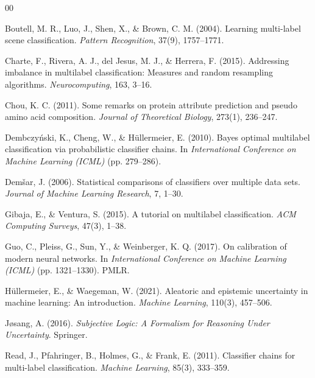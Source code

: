 \documentclass[1p,times]{elsarticle}
\begin{document}
\FloatBarrier
\begin{thebibliography}{00}

Boutell, M. R., Luo, J., Shen, X., \& Brown, C. M. (2004).
Learning multi-label scene classification.
\textit{Pattern Recognition}, 37(9), 1757--1771.

Charte, F., Rivera, A. J., del Jesus, M. J., \& Herrera, F. (2015).
Addressing imbalance in multilabel classification: Measures and random resampling algorithms.
\textit{Neurocomputing}, 163, 3--16.

Chou, K. C. (2011).
Some remarks on protein attribute prediction and pseudo amino acid composition.
\textit{Journal of Theoretical Biology}, 273(1), 236--247.

Dembczy{\'n}ski, K., Cheng, W., \& H{\"u}llermeier, E. (2010).
Bayes optimal multilabel classification via probabilistic classifier chains.
In \textit{International Conference on Machine Learning (ICML)} (pp. 279--286).

Dem{\v{s}}ar, J. (2006).
Statistical comparisons of classifiers over multiple data sets.
\textit{Journal of Machine Learning Research}, 7, 1--30.

Gibaja, E., \& Ventura, S. (2015).
A tutorial on multilabel classification.
\textit{ACM Computing Surveys}, 47(3), 1--38.

Guo, C., Pleiss, G., Sun, Y., \& Weinberger, K. Q. (2017).
On calibration of modern neural networks.
In \textit{International Conference on Machine Learning (ICML)} (pp. 1321--1330). PMLR.

H{\"u}llermeier, E., \& Waegeman, W. (2021).
Aleatoric and epistemic uncertainty in machine learning: An introduction.
\textit{Machine Learning}, 110(3), 457--506.

J{\o}sang, A. (2016).
\textit{Subjective Logic: A Formalism for Reasoning Under Uncertainty}.
Springer.

Read, J., Pfahringer, B., Holmes, G., \& Frank, E. (2011).
Classifier chains for multi-label classification.
\textit{Machine Learning}, 85(3), 333--359.


\end{thebibliography}
\end{document}
